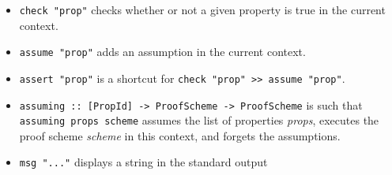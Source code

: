 \begin{itemize}
\itemsep1pt\parskip0pt
\item
  \texttt{check "prop"} checks whether or not a given property is true
  in the current context.
\item
  \texttt{assume "prop"} adds an assumption in the current context.
\item
  \texttt{assert "prop"} is a shortcut for
  \texttt{check "prop" \textgreater{}\textgreater{} assume "prop"}.
\item
  \texttt{assuming :: {[}PropId{]} -\textgreater{} ProofScheme -\textgreater{} ProofScheme}
  is such that \texttt{assuming props scheme} assumes the list of
  properties \emph{props}, executes the proof scheme \emph{scheme} in
  this context, and forgets the assumptions.
\item
  \texttt{msg "..."} displays a string in the standard output
\end{itemize}
